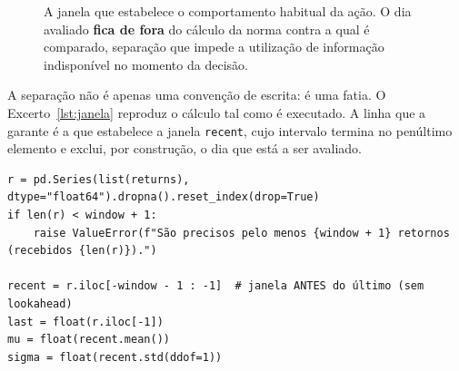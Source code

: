 \begin{figure}[htbp]
\centering
{}
\caption[A janela deslizante do \emph{z}-score]{A janela que estabelece o comportamento habitual da
ação. O dia avaliado \textbf{fica de fora} do cálculo da norma contra a qual é comparado, separação
que impede a utilização de informação indisponível no momento da decisão.}
\label{fig:met_janela}
\end{figure}

A separação não é apenas uma convenção de escrita: é uma fatia. O Excerto~\ref{lst:janela}
reproduz o cálculo tal como é executado. A linha que a garante é a que estabelece a janela
\texttt{recent}, cujo intervalo termina no penúltimo elemento e exclui, por construção, o dia que
está a ser avaliado.

\begin{lstlisting}[caption={[A janela que exclui o dia avaliado]A janela que exclui o dia
avaliado. O intervalo \texttt{[-window-1:-1]} termina antes do último elemento, pelo que o
retorno do dia em avaliação não entra na média nem no desvio-padrão contra os quais é
comparado. Reproduz-se o corpo da função de deteção, sem a indentação que ela tem no ficheiro
de origem.}, label={lst:janela}, float=htbp]
r = pd.Series(list(returns), dtype="float64").dropna().reset_index(drop=True)
if len(r) < window + 1:
    raise ValueError(f"São precisos pelo menos {window + 1} retornos (recebidos {len(r)}).")

recent = r.iloc[-window - 1 : -1]  # janela ANTES do último (sem lookahead)
last = float(r.iloc[-1])
mu = float(recent.mean())
sigma = float(recent.std(ddof=1))
\end{lstlisting}


